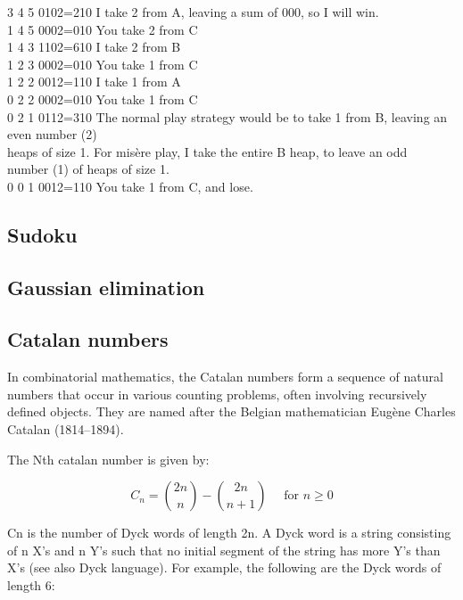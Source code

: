 \documentclass[10pt,letterpaper,twocolumn,twosided]{article}
\newcommand{\codigofuente}[1]{

\dotfill
}
\begin{document}
3 4 5 0102=210   I take 2 from A, leaving a sum of 000, so I will win.\\
1 4 5 0002=010   You take 2 from C\\
1 4 3 1102=610   I take 2 from B\\
1 2 3 0002=010   You take 1 from C\\
1 2 2 0012=110   I take 1 from A\\
0 2 2 0002=010   You take 1 from C\\
0 2 1 0112=310   The normal play strategy would be to take 1 from B, leaving an even number (2)\\
                 heaps of size 1.  For misère play, I take the entire B heap, to leave an odd\\
                 number (1) of heaps of size 1.\\
0 0 1 0012=110   You take 1 from C, and lose.\\

\subsection{Sudoku}

\codigofuente{src/misc/sudoku.cpp}

\codigofuente{src/misc/sudokuE.cpp}

\subsection{Gaussian elimination}

\codigofuente{src/misc/gaussian.cpp}

\subsection{Catalan numbers}

In combinatorial mathematics, the Catalan numbers form a sequence of natural numbers that occur in various counting problems, often involving recursively defined objects. They are named after the Belgian mathematician Eugène Charles Catalan (1814–1894).

The Nth catalan number is given by:

$$C_n = {2n\choose n} - {2n\choose n+1} \quad\text{ for }n\ge 0$$

Cn is the number of Dyck words of length 2n. A Dyck word is a string consisting of n X's and n Y's such that no initial segment of the string has more Y's than X's (see also Dyck language). For example, the following are the Dyck words of length 6:
\end{document}
